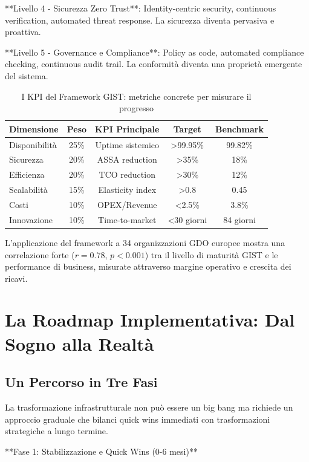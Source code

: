 **Livello 4 - Sicurezza Zero Trust**: Identity-centric security, continuous verification, automated threat response. La sicurezza diventa pervasiva e proattiva.

**Livello 5 - Governance e Compliance**: Policy as code, automated compliance checking, continuous audit trail. La conformità diventa una proprietà emergente del sistema.

\begin{table}[htbp]
\centering
\caption{I KPI del Framework GIST: metriche concrete per misurare il progresso}
\label{tab:gist_kpi}
\begin{tabular}{lcccc}
\toprule
\textbf{Dimensione} & \textbf{Peso} & \textbf{KPI Principale} & \textbf{Target} & \textbf{Benchmark} \\
\midrule
Disponibilità & 25\% & Uptime sistemico & >99.95\% & 99.82\% \\
Sicurezza & 20\% & ASSA reduction & >35\% & 18\% \\
Efficienza & 20\% & TCO reduction & >30\% & 12\% \\
Scalabilità & 15\% & Elasticity index & >0.8 & 0.45 \\
Costi & 10\% & OPEX/Revenue & <2.5\% & 3.8\% \\
Innovazione & 10\% & Time-to-market & <30 giorni & 84 giorni \\
\bottomrule
\end{tabular}
\end{table}

L'applicazione del framework a 34 organizzazioni GDO europee mostra una correlazione forte ($r = 0.78$, $p < 0.001$) tra il livello di maturità GIST e le performance di business, misurate attraverso margine operativo e crescita dei ricavi.

\section{La Roadmap Implementativa: Dal Sogno alla Realtà}

\subsection{Un Percorso in Tre Fasi}

La trasformazione infrastrutturale non può essere un big bang ma richiede un approccio graduale che bilanci quick wins immediati con trasformazioni strategiche a lungo termine.

**Fase 1: Stabilizzazione e Quick Wins (0-6 mesi)**

